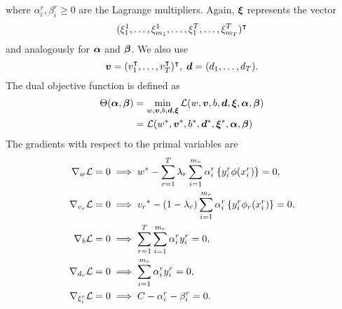 where $\alpha_i^r, \beta_i^r \geq 0$ are the Lagrange multipliers. Again, $\bm{\xi}$ represents the vector $$(\xi_1^1, \ldots, \xi_{m_1}^1, \ldots, \xi_1^T, \ldots, \xi_{m_T}^T)^\intercal$$ and analogously for $\bm{\alpha}$ and $\bm{\beta}$.
We also use 
$$ \bm{v} = (v_1^\intercal, \ldots, v_T^\intercal)^\intercal,\; \bm{d} = (d_1, \ldots, d_T).$$
The dual objective function is defined as 
\begin{equation}\nonumber
    \begin{aligned}
         \Theta(\bm{\alpha}, \bm{\beta}) &=  \min_{{w}, \bm{v}, b, \bm{d}, \bm{\xi}} \mathcal{L}({w}, \bm{v}, b, \bm{d}, \bm{\xi}, \bm{\alpha}, \bm{\beta}) \\
         &= \mathcal{L}({{w}}^*, {\bm{v}}^*, {b}^*, {\bm{d}}^*, {\bm{\xi}}^*, \bm{\alpha}, \bm{\beta})
    \end{aligned}    
\end{equation}
The gradients with respect to the primal variables are
\begin{align}
    \grad_{{w}} \lagr  = 0  &\implies \optim{{w}} - \sum_{r= 1}^\ntasks \lambda_r \sum_{i=1}^{m_r} {\alpha_i^r} \left\lbrace y_i^r \phi(x_i^r) \right\rbrace = 0 , \label{eq:common_repr_conv} \\
    \grad_{{v}_r} \lagr  = 0 &\implies \optim{{v}_r} - (1 - \lambda_r) \sum_{i=1}^{m_r} {\alpha_i^r} \left\lbrace y_i^r \phi_r(x_i^r) \right\rbrace = 0 , \label{eq:specific_repr_conv} \\
    \grad_{b} \lagr  = 0  &\implies \sum_{r= 1}^T \sum_{i=1}^{m_r} {\alpha_i^r} y_i^r = 0 , \label{eq:specific_eqconstr_conv}  \\
    \grad_{{d}_r} \lagr  = 0 &\implies \sum_{i=1}^{m_r} {\alpha_i^r} y_i^r = 0 , \label{eq:common_eqconstr_conv} \\
    \grad_{\xi_i^r} \lagr  = 0 &\implies C - {\alpha_i^r} - {\beta_i^r} = 0 . \label{eq:xi_feas_conv}
\end{align}
